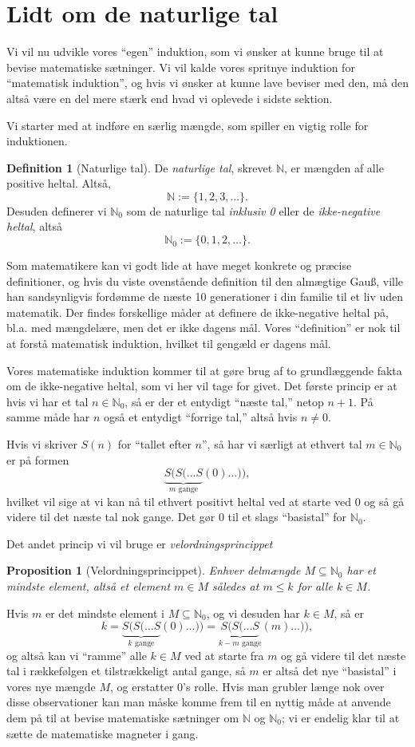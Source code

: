 \documentclass[a4paper, 12pt]{article}
\numberwithin{equation}{section}
\theoremstyle{plain}
\newtheorem{proposition}[saetning]{Proposition}
\theoremstyle{definition}
\newtheorem{definition}[saetning]{Definition}
\newcommand{\N}{\mathbb{N}}
\begin{document}
\section{Lidt om de naturlige tal}
Vi vil nu udvikle vores ``egen'' induktion, som vi ønsker at kunne bruge til at bevise matematiske sætninger. Vi vil kalde vores spritnye induktion for ``matematisk induktion'', og hvis vi ønsker at kunne lave beviser med den, må den altså være en del mere stærk end hvad vi oplevede i sidste sektion.

Vi starter med at indføre en særlig mængde, som spiller en vigtig rolle for induktionen.
\begin{definition}[Naturlige tal]
  De \emph{naturlige tal}, skrevet \(\N\), er mængden af alle positive heltal. Altså,
  \[
    \N:=\{1,2,3,\ldots\}.
  \]
  Desuden definerer vi \(\N_0\) som de naturlige tal \emph{inklusiv 0} eller de \emph{ikke-negative heltal}, altså
  \[
    \N_0:=\{0,1,2,\ldots\}.
    \]
\end{definition}
Som matematikere kan vi godt lide at have meget konkrete og præcise definitioner, og hvis du viste ovenstående definition til den almægtige Gau{\ss}, ville han sandsynligvis fordømme de næste 10 generationer i din familie til et liv uden matematik. Der findes forskellige måder at definere de ikke-negative heltal på, bl.a. med mængdelære, men det er ikke dagens mål. Vores ``definition'' er nok til at forstå matematisk induktion, hvilket til gengæld er dagens mål.

Vores matematiske induktion kommer til at gøre brug af to grundlæggende fakta om de ikke-negative heltal, som vi her vil tage for givet. Det første princip er at hvis vi har et  tal \(n\in\N_0\), så er der et entydigt ``næste tal,'' netop \(n+1\). På samme måde har \(n\) også et entydigt ``forrige tal,'' altså hvis \(n\neq 0\).

Hvis vi skriver \(S(n)\) for ``tallet efter \(n\)'', så har vi særligt at ethvert tal \(m\in\N_0\) er på formen
\[
  \underbrace{S(S(\ldots S}_{m\text{ gange}}(0)\ldots)),
\]
hvilket vil sige at vi kan nå til ethvert positivt heltal ved at starte ved 0 og så gå videre til det næste tal nok gange. Det gør 0 til et slags ``basistal'' for \(\N_0\).

Det andet princip vi vil bruge er \emph{velordningsprincippet}
\begin{proposition}[Velordningsprincippet]
  Enhver delmængde \(M\subseteq \N_0\) har et \emph{mindste element}, altså et element \(m\in M\) således at \(m\le k\) for alle \(k\in M\).
\end{proposition}
Hvis \(m\) er det mindste element i \(M\subseteq \N_0\), og vi desuden har \(k\in M\), så er
\[
  k=\underbrace{S(S(\ldots S}_{k\text{ gange}}(0)\ldots ))=\underbrace{S(S(\ldots S}_{k-m\text{ gange}}(m)\ldots )),
  \]
  og altså kan vi ``ramme'' alle \(k\in M\) ved at starte fra \(m\) og gå videre til det næste tal i rækkefølgen et tilstrækkeligt antal gange, så \(m\) er altså det nye ``basistal'' i vores nye mængde \(M\), og erstatter 0's rolle. Hvis man grubler længe nok over disse observationer kan man måske komme frem til en nyttig måde at anvende dem på til at bevise matematiske sætninger om \(\N\) og \(\N_0\); vi er endelig klar til at sætte de matematiske magneter i gang.
\end{document}
